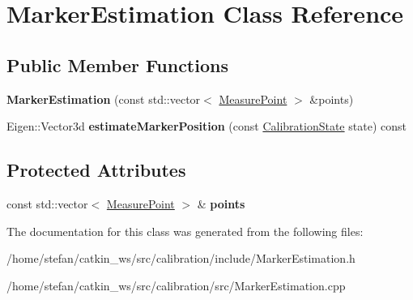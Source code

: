 \hypertarget{classMarkerEstimation}{\section{\-Marker\-Estimation \-Class \-Reference}
\label{classMarkerEstimation}
}
\subsection*{\-Public \-Member \-Functions}
\begin{DoxyCompactItemize}
\item 
\hypertarget{classMarkerEstimation_ae1e6badeba63e866b606b907985c17b2}{{\bfseries \-Marker\-Estimation} (const std\-::vector$<$ \hyperlink{classCameraMeasurePoint}{\-Measure\-Point} $>$ \&points)}\label{classMarkerEstimation_ae1e6badeba63e866b606b907985c17b2}

\item 
\hypertarget{classMarkerEstimation_a6c5c3ee310f9f2f5a27b88f1e2cf3d1b}{\-Eigen\-::\-Vector3d {\bfseries estimate\-Marker\-Position} (const \hyperlink{classCalibrationState}{\-Calibration\-State} state) const }\label{classMarkerEstimation_a6c5c3ee310f9f2f5a27b88f1e2cf3d1b}

\end{DoxyCompactItemize}
\subsection*{\-Protected \-Attributes}
\begin{DoxyCompactItemize}
\item 
\hypertarget{classMarkerEstimation_ab2ded828c72d1ef198861cbf5c999581}{const std\-::vector$<$ \hyperlink{classCameraMeasurePoint}{\-Measure\-Point} $>$ \& {\bfseries points}}\label{classMarkerEstimation_ab2ded828c72d1ef198861cbf5c999581}

\end{DoxyCompactItemize}


\-The documentation for this class was generated from the following files\-:\begin{DoxyCompactItemize}
\item 
/home/stefan/catkin\-\_\-ws/src/calibration/include/\-Marker\-Estimation.\-h\item 
/home/stefan/catkin\-\_\-ws/src/calibration/src/\-Marker\-Estimation.\-cpp\end{DoxyCompactItemize}
